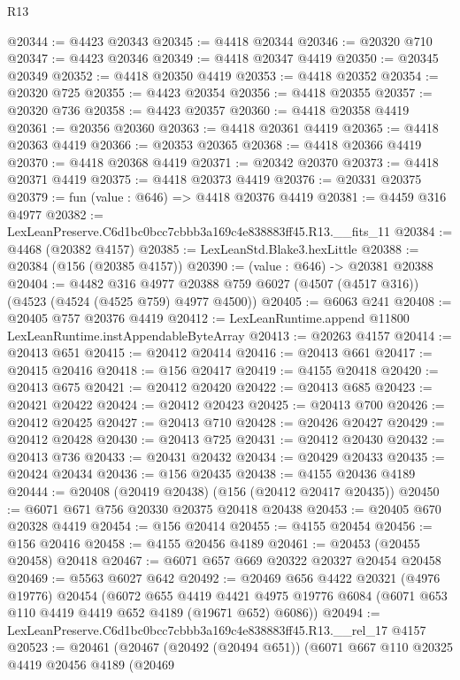 \begin{lexlean}{R13}
\begin{coremodule}
@20344 := @4423 @20343
@20345 := @4418 @20344
@20346 := @20320 @710
@20347 := @4423 @20346
@20349 := @4418 @20347 @4419
@20350 := @20345 @20349
@20352 := @4418 @20350 @4419
@20353 := @4418 @20352
@20354 := @20320 @725
@20355 := @4423 @20354
@20356 := @4418 @20355
@20357 := @20320 @736
@20358 := @4423 @20357
@20360 := @4418 @20358 @4419
@20361 := @20356 @20360
@20363 := @4418 @20361 @4419
@20365 := @4418 @20363 @4419
@20366 := @20353 @20365
@20368 := @4418 @20366 @4419
@20370 := @4418 @20368 @4419
@20371 := @20342 @20370
@20373 := @4418 @20371 @4419
@20375 := @4418 @20373 @4419
@20376 := @20331 @20375
@20379 := fun (value : @646) => @4418 @20376 @4419
@20381 := @4459 @316 @4977
@20382 := LexLeanPreserve.C6d1bc0bcc7cbbb3a169c4e838883ff45.R13.__fits_11
@20384 := @4468 (@20382 @4157)
@20385 := LexLeanStd.Blake3.hexLittle
@20388 := @20384 (@156 (@20385 @4157))
@20390 := (value : @646) -> @20381 @20388
@20404 := @4482
    @316
    @4977
    @20388
    @759
    @6027
    (@4507 (@4517 @316))
    (@4523 (@4524 (@4525 @759) @4977 @4500))
@20405 := @6063 @241
@20408 := @20405 @757 @20376 @4419
@20412 := LexLeanRuntime.append @11800 LexLeanRuntime.instAppendableByteArray
@20413 := @20263 @4157
@20414 := @20413 @651
@20415 := @20412 @20414
@20416 := @20413 @661
@20417 := @20415 @20416
@20418 := @156 @20417
@20419 := @4155 @20418
@20420 := @20413 @675
@20421 := @20412 @20420
@20422 := @20413 @685
@20423 := @20421 @20422
@20424 := @20412 @20423
@20425 := @20413 @700
@20426 := @20412 @20425
@20427 := @20413 @710
@20428 := @20426 @20427
@20429 := @20412 @20428
@20430 := @20413 @725
@20431 := @20412 @20430
@20432 := @20413 @736
@20433 := @20431 @20432
@20434 := @20429 @20433
@20435 := @20424 @20434
@20436 := @156 @20435
@20438 := @4155 @20436 @4189
@20444 := @20408 (@20419 @20438) (@156 (@20412 @20417 @20435))
@20450 := @6071 @671 @756 @20330 @20375 @20418 @20438
@20453 := @20405 @670 @20328 @4419
@20454 := @156 @20414
@20455 := @4155 @20454
@20456 := @156 @20416
@20458 := @4155 @20456 @4189
@20461 := @20453 (@20455 @20458) @20418
@20467 := @6071 @657 @669 @20322 @20327 @20454 @20458
@20469 := @5563 @6027 @642
@20492 := @20469
    @656
    @4422
    @20321
    (@4976 @19776)
    @20454
    (@6072
      @655
      @4419
      @4421
      @4975
      @19776
      @6084
      (@6071 @653 @110 @4419 @4419 @652 @4189 (@19671 @652) @6086))
@20494 := LexLeanPreserve.C6d1bc0bcc7cbbb3a169c4e838883ff45.R13.__rel_17 @4157
@20523 := @20461
    (@20467
      (@20492 (@20494 @651))
      (@6071
        @667
        @110
        @20325
        @4419
        @20456
        @4189
        (@20469

\end{coremodule}
\end{lexlean}
